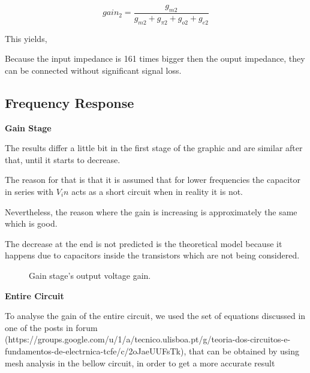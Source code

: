 $$gain_2 =\frac { g_{m2}}{g_{m2}+g_{\pi 2}+g_{o2}+g_{e2}}$$

This yields,


\vspace{1cm}

Because the input impedance is 161 times bigger then the ouput impedance, they can be connected without significant signal loss.



\subsection{Frequency Response}

\textbf{Gain Stage} 

 The results differ a little bit in the first stage of the graphic and are similar after that, until it starts to decrease.
 
 The reason for that is that it is assumed that for lower frequencies the capacitor in series with $V_in$ acts as a short circuit when in reality it is not.
 
 Nevertheless, the reason where the gain is increasing is approximately the same which is good.
 
 The decrease at the end is not predicted is the theoretical model because it happens due to capacitors inside the transistors which are not being considered.

\begin{figure}[h]
    \centering
{}
  \hfill
{}
\end{figure}

  \begin{figure}[h]
     \centering
     \caption{Gain stage's output voltage gain.}
     \label{fig_2_reação_normal}
 \end{figure}
 
 
 \vspace{1cm}
 
 \textbf{Entire Circuit} 
 
 \indent

To analyse the gain of the entire circuit, we used the set of equations discussed in one of the posts in forum (https://groups.google.com/u/1/a/tecnico.ulisboa.pt/g/teoria-dos-circuitos-e-fundamentos-de-electrnica-tcfe/c/2oJaeUUFsTk), that can be obtained by using mesh analysis in the bellow circuit, in order to get a more accurate result

